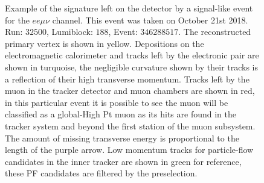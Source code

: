 \begin{figure}
  \centering
  \vfil
  \caption{Example of the signature left on the detector by a signal-like event
    for the $ee\mu\nu$ channel. This event was taken on October 21st 2018. Run: $32500$,
    Lumiblock: $188$, Event: $346288517$. The reconstructed primary vertex is shown in yellow.
    Depositions on the electromagnetic calorimeter
    and tracks left by the electronic pair are shown in turquoise, the negligible curvature
    shown by their tracks is a reflection of their high transverse momentum. Tracks left by the muon
    in the tracker detector and muon chambers are shown in red, in this particular event it
    is possible to see the muon will be classified as a global-High Pt muon as its hits
    are found in the tracker system and beyond the first station of the muon subsystem.
    The amount of missing
    transverse energy is proportional to the length of the purple arrow. Low momentum
    tracks for particle-flow candidates in the inner tracker are shown in green for
    reference, these PF candidates are filtered by the preselection. }
  \label{fig:Fireworks_eemuv}
\end{figure}

